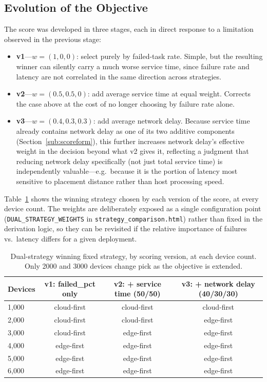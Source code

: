 \documentclass[10pt,conference]{IEEEtran}
\begin{document}
\subsection{Evolution of the Objective}\label{sub:evolution}
The score was developed in three stages, each in direct response to a limitation observed in the previous stage:
\begin{itemize}
\item \textbf{v1}---$w = (1, 0, 0)$: select purely by failed-task rate. Simple, but the resulting winner can silently carry a much worse service time, since failure rate and latency are not correlated in the same direction across strategies.
\item \textbf{v2}---$w = (0.5, 0.5, 0)$: add average service time at equal weight. Corrects the case above at the cost of no longer choosing by failure rate alone.
\item \textbf{v3}---$w = (0.4, 0.3, 0.3)$: add average network delay. Because service time already contains network delay as one of its two additive components (Section~\ref{sub:scoreform}), this further increases network delay's effective weight in the decision beyond what v2 gives it, reflecting a judgment that reducing network delay specifically (not just total service time) is independently valuable---e.g.\ because it is the portion of latency most sensitive to placement distance rather than host processing speed.
\end{itemize}
Table~\ref{tab:winners} shows the winning strategy chosen by each version of the score, at every device count. The weights are deliberately exposed as a single configuration point (\texttt{DUAL\_STRATEGY\_WEIGHTS} in \texttt{strategy\_comparison.html}) rather than fixed in the derivation logic, so they can be revisited if the relative importance of failures vs.\ latency differs for a given deployment.

\begin{table}[!t]
\centering
\caption{Dual-strategy winning fixed strategy, by scoring version, at each device count. Only 2000 and 3000 devices change pick as the objective is extended.}
\label{tab:winners}
\begin{tabular}{lccc}
\toprule
\textbf{Devices} & \textbf{v1: failed\_pct only} & \textbf{v2: + service time (50/50)} & \textbf{v3: + network delay (40/30/30)} \\
\midrule
1,000 & cloud-first & cloud-first & cloud-first \\
2,000 & cloud-first & cloud-first & edge-first \\
3,000 & cloud-first & edge-first & edge-first \\
4,000 & edge-first & edge-first & edge-first \\
5,000 & edge-first & edge-first & edge-first \\
6,000 & edge-first & edge-first & edge-first \\
\bottomrule
\end{tabular}
\end{table}
\end{document}
